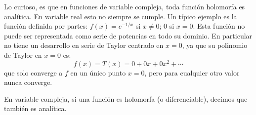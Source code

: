 Lo curioso, es que en funciones de variable compleja, toda función holomorfa es analítica. En variable real esto no siempre se cumple. Un típico ejemplo es la función definida por partes: $f(x)=e^{-1/x}$ si $x\neq0$; $0$ si $x=0$. Esta función no puede ser representada como serie de potencias en todo su dominio. En particular no tiene un desarrollo en serie de Taylor centrado en $x=0$, ya que su polinomio de Taylor en $x=0$ es:
\begin{equation*}
  f(x) = T(x) = 0 + 0x + 0x^2 + \cdots
\end{equation*}
que solo converge a $f$ en un único punto $x=0$, pero para cualquier otro valor nunca converge. 

En variable compleja, si una función es holomorfa (o diferenciable), decimos que también es analítica.
